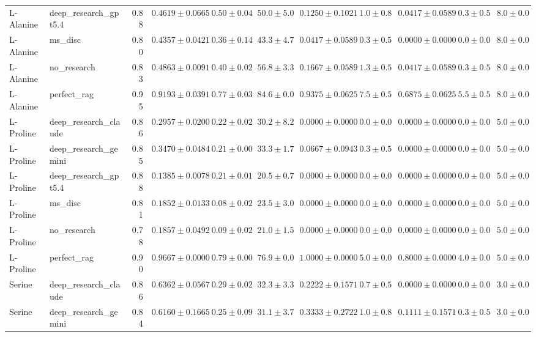 \begin{table}[htbp]
\begin{tabular}{llrrrrrrrrr}
L-Alanine & deep_research_gpt5.4 & 0.88 & $0.4619 \pm 0.0665$ & $0.50 \pm 0.04$ & $50.0 \pm 5.0$ & $0.1250 \pm 0.1021$ & $1.0 \pm 0.8$ & $0.0417 \pm 0.0589$ & $0.3 \pm 0.5$ & $8.0 \pm 0.0$ \\
L-Alanine & ms_disc & 0.80 & \cellcolor{red!25}$0.4357 \pm 0.0421$ & $0.36 \pm 0.14$ & $43.3 \pm 4.7$ & $0.0417 \pm 0.0589$ & $0.3 \pm 0.5$ & $0.0000 \pm 0.0000$ & $0.0 \pm 0.0$ & $8.0 \pm 0.0$ \\
L-Alanine & no_research & 0.83 & $0.4863 \pm 0.0091$ & $0.40 \pm 0.02$ & $56.8 \pm 3.3$ & $0.1667 \pm 0.0589$ & $1.3 \pm 0.5$ & $0.0417 \pm 0.0589$ & $0.3 \pm 0.5$ & $8.0 \pm 0.0$ \\
L-Alanine & perfect_rag & 0.95 & \cellcolor{green!25}$0.9193 \pm 0.0391$ & $0.77 \pm 0.03$ & $84.6 \pm 0.0$ & $0.9375 \pm 0.0625$ & $7.5 \pm 0.5$ & $0.6875 \pm 0.0625$ & $5.5 \pm 0.5$ & $8.0 \pm 0.0$ \\
\midrule
L-Proline & deep_research_claude & 0.86 & $0.2957 \pm 0.0200$ & $0.22 \pm 0.02$ & $30.2 \pm 8.2$ & $0.0000 \pm 0.0000$ & $0.0 \pm 0.0$ & $0.0000 \pm 0.0000$ & $0.0 \pm 0.0$ & $5.0 \pm 0.0$ \\
L-Proline & deep_research_gemini & 0.85 & $0.3470 \pm 0.0484$ & $0.21 \pm 0.00$ & $33.3 \pm 1.7$ & $0.0667 \pm 0.0943$ & $0.3 \pm 0.5$ & $0.0000 \pm 0.0000$ & $0.0 \pm 0.0$ & $5.0 \pm 0.0$ \\
L-Proline & deep_research_gpt5.4 & 0.88 & \cellcolor{red!25}$0.1385 \pm 0.0078$ & $0.21 \pm 0.01$ & $20.5 \pm 0.7$ & $0.0000 \pm 0.0000$ & $0.0 \pm 0.0$ & $0.0000 \pm 0.0000$ & $0.0 \pm 0.0$ & $5.0 \pm 0.0$ \\
L-Proline & ms_disc & 0.81 & $0.1852 \pm 0.0133$ & $0.08 \pm 0.02$ & $23.5 \pm 3.0$ & $0.0000 \pm 0.0000$ & $0.0 \pm 0.0$ & $0.0000 \pm 0.0000$ & $0.0 \pm 0.0$ & $5.0 \pm 0.0$ \\
L-Proline & no_research & 0.78 & $0.1857 \pm 0.0492$ & $0.09 \pm 0.02$ & $21.0 \pm 1.5$ & $0.0000 \pm 0.0000$ & $0.0 \pm 0.0$ & $0.0000 \pm 0.0000$ & $0.0 \pm 0.0$ & $5.0 \pm 0.0$ \\
L-Proline & perfect_rag & 0.90 & \cellcolor{green!25}$0.9667 \pm 0.0000$ & $0.79 \pm 0.00$ & $76.9 \pm 0.0$ & $1.0000 \pm 0.0000$ & $5.0 \pm 0.0$ & $0.8000 \pm 0.0000$ & $4.0 \pm 0.0$ & $5.0 \pm 0.0$ \\
\midrule
Serine & deep_research_claude & 0.86 & $0.6362 \pm 0.0567$ & $0.29 \pm 0.02$ & $32.3 \pm 3.3$ & $0.2222 \pm 0.1571$ & $0.7 \pm 0.5$ & $0.0000 \pm 0.0000$ & $0.0 \pm 0.0$ & $3.0 \pm 0.0$ \\
Serine & deep_research_gemini & 0.84 & $0.6160 \pm 0.1665$ & $0.25 \pm 0.09$ & $31.1 \pm 3.7$ & $0.3333 \pm 0.2722$ & $1.0 \pm 0.8$ & $0.1111 \pm 0.1571$ & $0.3 \pm 0.5$ & $3.0 \pm 0.0$ \\

\end{tabular}
\end{table}
